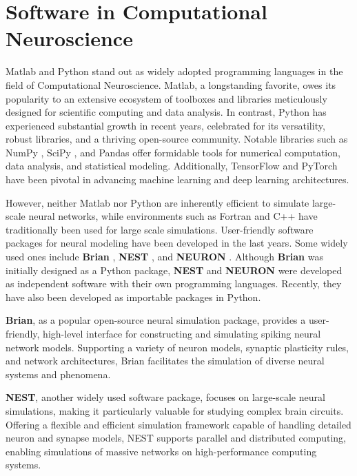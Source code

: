 \documentclass[../main.tex]{subfiles}
\begin{document}
\section{Software in Computational Neuroscience}
Matlab and Python stand out as widely adopted programming languages in the field of Computational Neuroscience.
Matlab, a longstanding favorite, owes its popularity to an extensive ecosystem of toolboxes and libraries meticulously designed for scientific computing and data analysis.
In contrast, Python has experienced substantial growth in recent years, celebrated for its versatility, robust libraries, and a thriving open-source community.
Notable libraries such as NumPy \citep{harris2020array}, SciPy \citep{2020SciPy-NMeth}, and Pandas \citep{reback2020pandas} offer formidable tools for numerical computation, data analysis, and statistical modeling.
Additionally, TensorFlow \citep{abadi2016tensorflow} and PyTorch \citep{NEURIPS2019_bdbca288} have been pivotal in advancing machine learning and deep learning architectures.

However, neither Matlab nor Python are inherently efficient to simulate large-scale neural networks,
while environments such as Fortran and C++ have traditionally been used for large scale simulations.
User-friendly software packages for neural modeling have been developed in the last years.
Some widely used ones include \textbf{Brian} \citep{goodman2009brian,stimberg_brian_2019}, \textbf{NEST} \citep{gewaltig2007nest,eppler2009pynest}, and \textbf{NEURON} \citep{carnevale_neuron_1997,hines_neuron_2009}.
Although \textbf{Brian} was initially designed as a Python package, \textbf{NEST} and \textbf{NEURON} were developed as independent software with their own programming languages.
Recently, they have also been developed as importable packages in Python.

\textbf{Brian}, as a popular open-source neural simulation package, provides a user-friendly, high-level interface for constructing and simulating spiking neural network models.
Supporting a variety of neuron models, synaptic plasticity rules, and network architectures, Brian facilitates the simulation of diverse neural systems and phenomena.

\textbf{NEST}, another widely used software package, focuses on large-scale neural simulations, making it particularly valuable for studying complex brain circuits.
Offering a flexible and efficient simulation framework capable of handling detailed neuron and synapse models, NEST supports parallel and distributed computing, enabling simulations of massive networks on high-performance computing systems.
\end{document}
